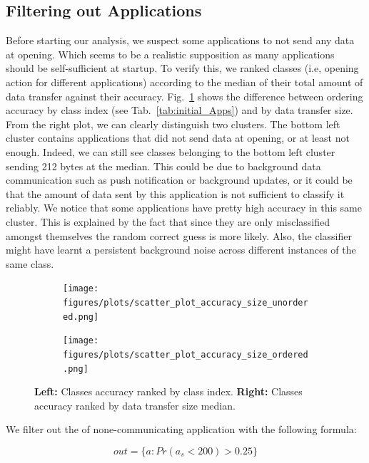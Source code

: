 \subsection{Filtering out Applications} 
\label{subsec:Filtering out Application}
Before starting our analysis, we suspect some applications to not send any data at opening. Which seems to be a realistic supposition as many applications should be self-sufficient at startup. To verify this, we ranked classes (i.e, opening action for different applications) according to the median of their total amount of data transfer against their accuracy. Fig.~\ref{fig:acc_ranked} shows the difference between ordering accuracy by class index (see Tab.~\ref{tab:initial_Apps}) and by data transfer size. From the right plot, we can clearly distinguish two clusters. The bottom left cluster contains applications that did not send data at opening, or at least not enough. Indeed, we can still see classes belonging to the bottom left cluster sending 212 bytes at the median. This could be due to background data communication such as push notification or background updates, or it could be that the amount of data sent by this application is not sufficient to classify it reliably. We notice that some applications have pretty high accuracy in this same cluster. This is explained by the fact that since they are only misclassified amongst themselves the random correct guess is more likely. Also, the classifier might have learnt a persistent background noise across different instances of the same class.
\\

\begin{figure}[H]
\centering
\begin{subfigure}{.5\textwidth}
  \centering
  \texttt{[image: figures/plots/scatter\_plot\_accuracy\_size\_unordered.png]}
\end{subfigure}%
\begin{subfigure}{.5\textwidth}
  \centering
  \texttt{[image: figures/plots/scatter\_plot\_accuracy\_size\_ordered.png]}
\end{subfigure}
\caption{\textbf{Left:} Classes accuracy ranked by class index. \textbf{Right:} Classes accuracy ranked by data transfer size median.}
\label{fig:acc_ranked}
\end{figure}


We filter out the of none-communicating application with the following formula:

$$ out = \{a:Pr(a_s<200) > 0.25\} $$

